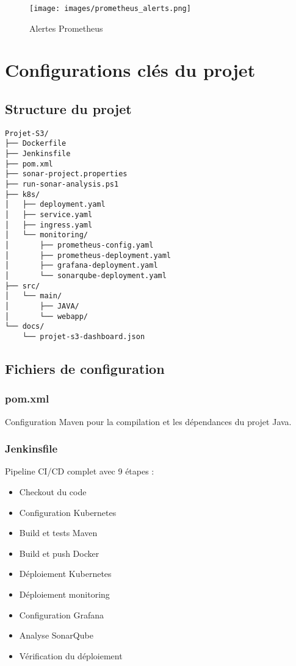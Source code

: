 \documentclass[12pt,a4paper]{article}
\begin{document}
\begin{figure}[H]
    \centering
    \texttt{[image: images/prometheus\_alerts.png]}
    \caption{Alertes Prometheus}
    \label{fig:prometheus_alerts}
\end{figure}

\newpage

\section{Configurations clés du projet}

\subsection{Structure du projet}

\begin{lstlisting}
Projet-S3/
├── Dockerfile
├── Jenkinsfile
├── pom.xml
├── sonar-project.properties
├── run-sonar-analysis.ps1
├── k8s/
│   ├── deployment.yaml
│   ├── service.yaml
│   ├── ingress.yaml
│   └── monitoring/
│       ├── prometheus-config.yaml
│       ├── prometheus-deployment.yaml
│       ├── grafana-deployment.yaml
│       └── sonarqube-deployment.yaml
├── src/
│   └── main/
│       ├── JAVA/
│       └── webapp/
└── docs/
    └── projet-s3-dashboard.json
\end{lstlisting}

\subsection{Fichiers de configuration}

\subsubsection{pom.xml}
Configuration Maven pour la compilation et les dépendances du projet Java.

\subsubsection{Jenkinsfile}
Pipeline CI/CD complet avec 9 étapes :
\begin{itemize}
    \item Checkout du code
    \item Configuration Kubernetes
    \item Build et tests Maven
    \item Build et push Docker
    \item Déploiement Kubernetes
    \item Déploiement monitoring
    \item Configuration Grafana
    \item Analyse SonarQube
    \item Vérification du déploiement
\end{itemize}
\end{document}
